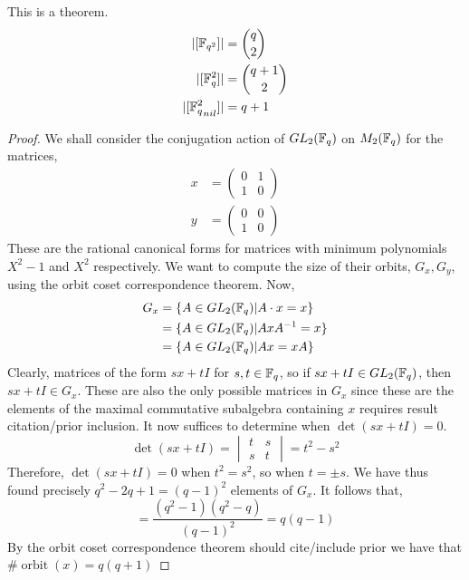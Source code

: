 \documentclass{amsart}
\begin{document}
\begin{theorem}
    This is a theorem.
    \begin{align}
        |[\protect\mathbb{F}_{q^2}]|       &= \binom{q}{2} \\
        |[\protect\mathbb{F}_q^2]|         &= \binom{q + 1}{2} \\
        |[{\protect\mathbb{F}_q^2}_{nil}]| &= q + 1
    \end{align}
\end{theorem}
\begin{proof}
    We shall consider the conjugation action of $GL_2(\protect\mathbb{F}_q)$ on $M_2(\protect\mathbb{F}_q)$ for the matrices,
    \begin{align*}
        x &= 
        \begin{pmatrix}
            0 & 1 \\
            1 & 0
        \end{pmatrix} \\
        y &=
        \begin{pmatrix}
            0 & 0 \\
            1 & 0
        \end{pmatrix}
    \end{align*}
    These are the rational canonical forms for matrices with minimum polynomials $X^2 - 1$ and $X^2$ respectively.
    We want to compute the size of their orbits, $G_x, G_y$, using the orbit coset correspondence theorem.
    Now,
    \begin{align*}
        G_x &= \{A \in GL_2(\protect\mathbb{F}_q) | A \cdot x = x\} \\
            &= \{A \in GL_2(\protect\mathbb{F}_q) | AxA^{-1} = x\} \\
            &= \{A \in GL_2(\protect\mathbb{F}_q) | Ax = xA\} 
    \end{align*}
    Clearly, matrices of the form $sx + tI$ for $s,t \in \protect\mathbb{F}_q$, so if $sx + tI \in GL_2(\protect\mathbb{F}_q)$, then $sx + tI \in G_x$. These are also the only possible matrices in $G_x$ since these are the elements of the maximal commutative subalgebra containing $x$ {\color{blue} requires result citation/prior inclusion}. It now suffices to determine when $\det(sx + tI) = 0$.
    \begin{equation*}
        \det(sx+tI) =
        \begin{vmatrix}
            t & s \\
            s & t
        \end{vmatrix} = t^2 - s^2
    \end{equation*}
    Therefore, $\det(sx + tI) = 0$ when $t^2 = s^2$, so when $t = \pm s$. We have thus found precisely $q^2 - 2q + 1 = (q-1)^2$ elements of $G_x$. It follows that,
    \begin{equation*}
        [G:G_x] = \frac{(q^2-1)(q^2-q)}{(q-1)^2} = q(q-1)
    \end{equation*}
    By the orbit coset correspondence theorem {\color{blue} should cite/include prior} we have that $\#\operatorname{orbit}(x) = q(q + 1)$


\end{proof}
\end{document}
